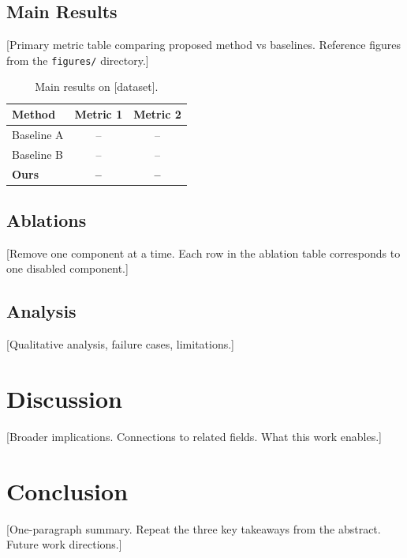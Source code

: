 \documentclass[10pt]{article}
\begin{document}
\subsection{Main Results}
[Primary metric table comparing proposed method vs baselines. Reference
figures from the \texttt{figures/} directory.]

\begin{table}[t]
\centering
\caption{Main results on [dataset].}
\label{tab:main}
\begin{tabular}{lcc}
\toprule
\textbf{Method} & \textbf{Metric 1} & \textbf{Metric 2} \\
\midrule
Baseline A & -- & -- \\
Baseline B & -- & -- \\
\textbf{Ours} & \textbf{--} & \textbf{--} \\
\bottomrule
\end{tabular}
\end{table}

\subsection{Ablations}
[Remove one component at a time. Each row in the ablation table corresponds to
one disabled component.]

\subsection{Analysis}
[Qualitative analysis, failure cases, limitations.]

\section{Discussion}
\label{sec:discussion}

[Broader implications. Connections to related fields. What this work enables.]

\section{Conclusion}
\label{sec:conclusion}

[One-paragraph summary. Repeat the three key takeaways from the abstract.
Future work directions.]



\end{document}
